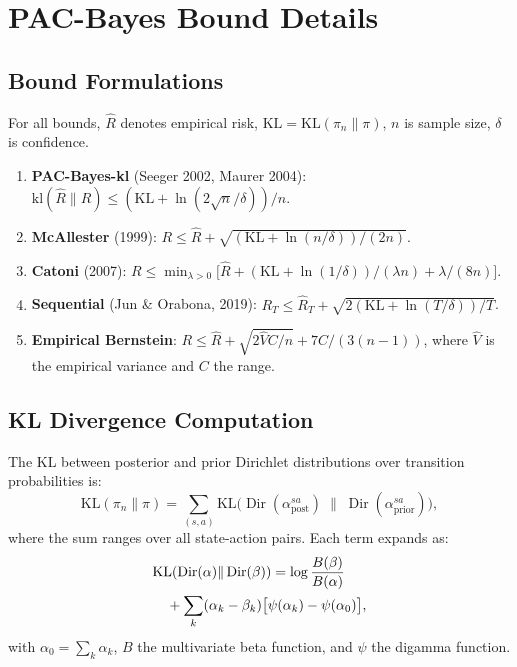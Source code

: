 \documentclass[11pt]{article}
\newcommand{\KL}{\mathrm{KL}}
\DeclareMathOperator{\Dir}{Dir}
\begin{document}
\section{PAC-Bayes Bound Details}\label{app:pacbayes}

\subsection{Bound Formulations}

For all bounds, $\hat{R}$ denotes empirical risk,
$\KL = \KL(\pi_n \| \pi)$, $n$ is sample size, $\delta$ is
confidence.

\begin{enumerate}[nosep]
\item \textbf{PAC-Bayes-kl} (Seeger 2002, Maurer 2004):
$\mathrm{kl}(\hat{R} \| R) \leq (\KL + \ln(2\sqrt{n}/\delta))/n$.

\item \textbf{McAllester} (1999):
$R \leq \hat{R} + \sqrt{(\KL + \ln(n/\delta))/(2n)}$.

\item \textbf{Catoni} (2007):
$R \leq \min_{\lambda > 0}\bigl[\hat{R} +
(\KL + \ln(1/\delta))/(\lambda n) + \lambda/(8n)\bigr]$.

\item \textbf{Sequential} (Jun \& Orabona, 2019):
$R_T \leq \hat{R}_T + \sqrt{2(\KL + \ln(T/\delta))/T}$.

\item \textbf{Empirical Bernstein}:
$R \leq \hat{R} + \sqrt{2\hat{V}C/n} + 7C/(3(n{-}1))$,
where $\hat{V}$ is the empirical variance and $C$ the range.
\end{enumerate}

\subsection{KL Divergence Computation}

The KL between posterior and prior Dirichlet distributions over
transition probabilities is:
\begin{equation}
  \KL(\pi_n \| \pi) = \sum_{(s,a)} \KL\bigl(
    \Dir(\alpha^{sa}_{\mathrm{post}}) \;\|\;
    \Dir(\alpha^{sa}_{\mathrm{prior}})\bigr),
\end{equation}
where the sum ranges over all state-action pairs.  Each term expands
as:
\begin{align}
  &\KL(\Dir(\alpha) \| \Dir(\beta)) =
    \log \frac{B(\beta)}{B(\alpha)} \\
  &\quad + \sum_k (\alpha_k - \beta_k)
    \bigl[\psi(\alpha_k) - \psi(\alpha_0)\bigr], \notag
\end{align}
with $\alpha_0 = \sum_k \alpha_k$, $B$ the multivariate beta
function, and $\psi$ the digamma function.
\end{document}
